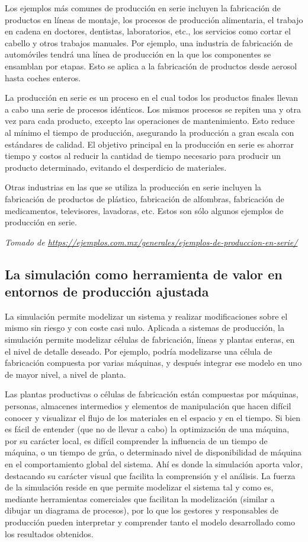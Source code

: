 \documentclass[12pt,letterpaper]{article}
\begin{document}
Los ejemplos más comunes de producción en serie incluyen la fabricación de productos en líneas de montaje, los procesos de producción alimentaria, el trabajo en cadena en doctores, dentistas, laboratorios, etc., los servicios como cortar el cabello y otros trabajos manuales. Por ejemplo, una industria de fabricación de automóviles tendrá una línea de producción en la que los componentes se ensamblan por etapas. Esto se aplica a la fabricación de productos desde aerosol hasta coches enteros.

La producción en serie es un proceso en el cual todos los productos finales llevan a cabo una serie de procesos idénticos. Los mismos procesos se repiten una y otra vez para cada producto, excepto las operaciones de mantenimiento. Esto reduce al mínimo el tiempo de producción, asegurando la producción a gran escala con estándares de calidad. El objetivo principal en la producción en serie es ahorrar tiempo y costos al reducir la cantidad de tiempo necesario para producir un producto determinado, evitando el desperdicio de materiales.

Otras industrias en las que se utiliza la producción en serie incluyen la fabricación de productos de plástico, fabricación de alfombras, fabricación de medicamentos, televisores, lavadoras, etc. Estos son sólo algunos ejemplos de producción en serie.

\noindent\textit{Tomado de \url{https://ejemplos.com.mx/generales/ejemplos-de-produccion-en-serie/}}

\subsection*{La simulación como herramienta de valor en entornos de producción ajustada}

La simulación permite modelizar un sistema y realizar modificaciones sobre el mismo sin riesgo y con coste casi nulo. Aplicada a sistemas de producción, la simulación permite modelizar células de fabricación, líneas y plantas enteras, en el nivel de detalle deseado. Por ejemplo, podría modelizarse una célula de fabricación compuesta por varias máquinas, y después integrar ese modelo en uno de mayor nivel, a nivel de planta.

Las plantas productivas o células de fabricación están compuestas por máquinas, personas, almacenes intermedios y elementos de manipulación que hacen difícil conocer y visualizar el flujo de los materiales en el espacio y en el tiempo. Si bien es fácil de entender (que no de llevar a cabo) la optimización de una máquina, por su carácter local, es difícil comprender la influencia de un tiempo de máquina, o un tiempo de grúa, o determinado nivel de disponibilidad de máquina en el comportamiento global del sistema. Ahí es donde la simulación aporta valor, destacando su carácter visual que facilita la comprensión y el análisis. La fuerza de la simulación reside en que permite modelizar el sistema tal y como es, mediante herramientas comerciales que facilitan la modelización (similar a dibujar un diagrama de procesos), por lo que los gestores y responsables de producción pueden interpretar y comprender tanto el modelo desarrollado como los resultados obtenidos.
\end{document}
